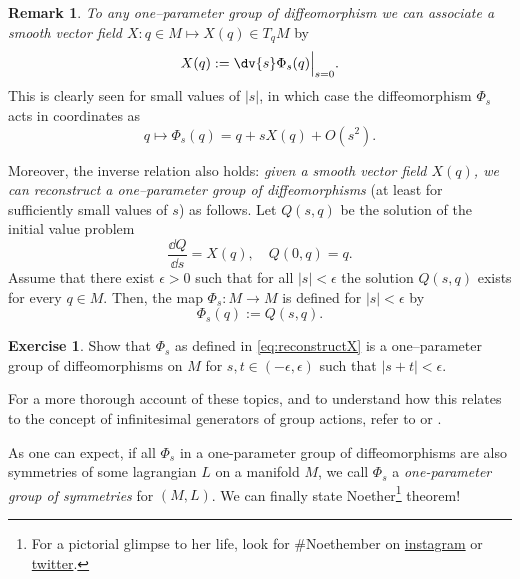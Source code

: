 \documentclass[english,fontsize=11pt,paper=b5]{scrbook}
\theoremstyle{definition}
\newtheorem{remark}{Remark}[chapter]
\newtheorem{exercise}{Exercise}[chapter]
\begin{document}
    \begin{remark}
      \emph{To any one--parameter group of diffeomorphism we can associate a smooth vector field $X : q\in M \mapsto X(q)\in T_qM$} by
      \begin{equation}
        X(q) := \dv{s} \Phi_s(q) \Big|_{s=0}.
      \end{equation}
      This is clearly seen for small values of $|s|$, in which case the diffeomorphism $\Phi_s$ acts in coordinates as
      \begin{equation}\label{eq:infinitesimalSymmetryExp}
        q \mapsto \Phi_s(q) = q + s X(q) + O(s^2).
      \end{equation}

      Moreover, the inverse relation also holds: \emph{given a smooth vector field $X(q)$, we can reconstruct a one--parameter group of diffeomorphisms} (at least for sufficiently small values of $s$) as follows.
      Let $Q(s, q)$ be the solution of the initial value problem
      \begin{equation}\label{eq:NoetherCoords}
        \frac{\dd Q}{\dd s} = X(q), \quad Q(0, q) = q.
      \end{equation}
      Assume that there exist $\epsilon >0$ such that for all $|s|<\epsilon$ the solution $Q(s,q)$ exists for every $q\in M$.
      Then, the map $\Phi_s:M\to M$ is defined for $|s|<\epsilon$ by
      \begin{equation}\label{eq:reconstructX}
        \Phi_s(q) := Q(s, q).
      \end{equation}

      \begin{exercise}
        Show that $\Phi_s$ as defined in \eqref{eq:reconstructX} is a one--parameter group of diffeomorphisms on $M$ for $s,t \in(-\epsilon,\epsilon)$ such that $|s + t| < \epsilon$.
      \end{exercise}

      For a more thorough account of these topics, and to understand how this relates to the concept of infinitesimal generators of group actions, refer to \cite[Chapters 9 and 20]{book:lee} or \cite[Chapters 3 and 4]{lectures:aom:seri}.
    \end{remark}

    As one can expect, if all $\Phi_s$ in a one-parameter group of diffeomorphisms are also symmetries of some lagrangian $L$ on a manifold $M$, we call $\Phi_s$ a \emph{one-parameter group of symmetries} for $(M,L)$. We can finally state Noether\footnote{For a pictorial glimpse to her life, look for \#Noethember on \href{https://www.instagram.com/explore/tags/noethember/}{instagram} or \href{https://twitter.com/search?q=noethember}{twitter}.} theorem!
\end{document}
